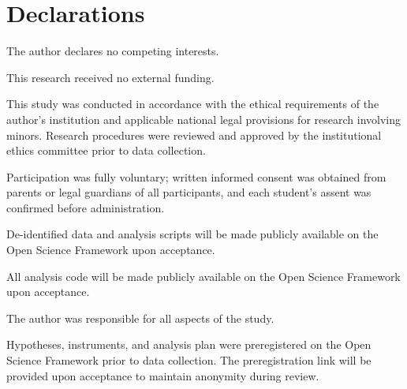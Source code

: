 \documentclass[pdflatex,sn-apa]{sn-jnl}%
\begin{document}
\backmatter


\section*{Declarations}

 The author declares no competing interests.

 This research received no external funding.

 This study was conducted in accordance with the ethical requirements of the author's institution and applicable national legal provisions for research involving minors. Research procedures were reviewed and approved by the institutional ethics committee prior to data collection.

 Participation was fully voluntary; written informed consent was obtained from parents or legal guardians of all participants, and each student's assent was confirmed before administration.

 De-identified data and analysis scripts will be made publicly available on the Open Science Framework upon acceptance.

 All analysis code will be made publicly available on the Open Science Framework upon acceptance.

 The author was responsible for all aspects of the study.

 Hypotheses, instruments, and analysis plan were preregistered on the Open Science Framework prior to data collection. The preregistration link will be provided upon acceptance to maintain anonymity during review.


\end{document}
